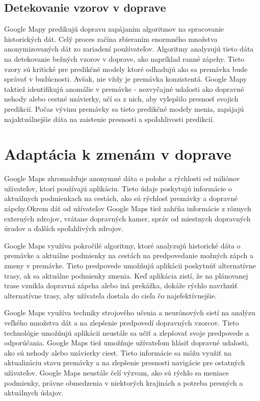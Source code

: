 \documentclass[10pt,slovak,a4paper]{article}
\begin{document}
\subsection{Detekovanie vzorov v doprave}
Google Mapy predikujú dopravu zapájaním algoritmov na spracovanie historických dát. Celý proces začína zbieraním enormného množstva anonymizovaných dát zo zariadení používateľov. Algoritmy analyzujú tieto dáta na detekovanie bežných vzorov v doprave, ako napríklad ranné zápchy. Tieto vzory sú kritické pre predikčné modely ktoré odhadujú ako sa premávka bude správať v budúcnosti.
Avšak, nie vždy je premávka konzistentá. Google Mapy taktiež identifikujú anomálie v premávke - nezvyčajné udalosti ako dopravné nehody alebo cestné uzávierky, učí sa z nich, aby vylepšilo presnosť svojich predikcií. Počas vývinu premávky sa tieto predikčné modely menia, zapájajú najaktuálnejšie dáta na zaistenie presnosti a spoľahlivosti predikcií.

\section{Adaptácia k zmenám v doprave}\label{Zmeny}
Google Maps zhromažďuje anonymné dáta o polohe a rýchlosti od miliónov užívateľov, ktorí používajú aplikáciu. Tieto údaje poskytujú informácie o aktuálnych podmienkach na cestách, ako sú rýchlosť premávky a dopravné zápchy.Okrem dát od užívateľov Google Maps tiež zahŕňa informácie z rôznych externých zdrojov, vrátane dopravných kamer, správ od miestnych dopravných úradov a ďalších spoľahlivých zdrojov.
\par Google Maps využíva pokročilé algoritmy, ktoré analyzujú historické dáta o premávke a aktuálne podmienky na cestách na predpovedanie možných zápch a zmeny v premávke. Tieto predpovede umožňujú aplikácii poskytnúť alternatívne trasy, ak sa aktuálne podmienky zmenia. Keď aplikácia zistí, že na plánovanej trase vznikla dopravná zápcha alebo iná prekážka, dokáže rýchlo navrhnúť alternatívne trasy, aby užívateľa dostala do cieľa čo najefektívnejšie.
\par Google Maps využíva techniky strojového učenia a neurónových sietí na analýzu veľkého množstva dát a na zlepšenie predpovedí dopravných vzorcov. Tieto technológie umožňujú aplikácii neustále sa učiť a zlepšovať svoje predpovede a odporúčania. Google Maps tiež umožňuje užívateľom hlásiť dopravné udalosti, ako sú nehody alebo uzávierky ciest. Tieto informácie sa môžu využiť na aktualizáciu stavu premávky a na zlepšenie presnosti navigácie pre ostatných užívateľov. Google Maps neustále čelí výzvam, ako sú rýchlo sa meniace podmienky, právne obmedzenia v niektorých krajinách a potreba presných a aktuálnych údajov.
\end{document}
